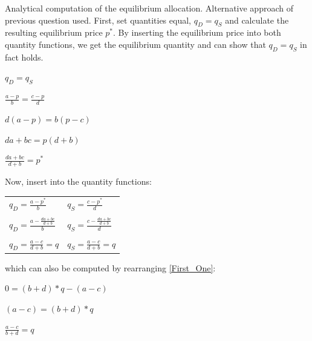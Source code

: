 \documentclass{article}
\begin{document}
Analytical computation of the equilibrium allocation. Alternative approach of previous question used. First, set quantities equal, $q_D = q_S$ and calculate the resulting equilibrium price $p^{*}$. By inserting the equilibrium price into both quantity functions, we get the equilibrium quantity and can show that $q_D = q_S$ in fact holds.
\begin{center} $q_D = q_S $ \end{center}
\begin{center}$\frac{a-p}{b} = \frac{c-p}{d} $ \end{center}
\begin{center}$d(a-p) = b(p-c)$ \end{center}
\begin{center}$da+bc=p(d+b)$ \end{center}
\begin{center}$\frac{da+bc}{d+b} = p^{*}$\end{center}
Now, insert into the quantity functions:
\begin{center} \begin{tabular}{ l l }
   $q_D= \frac{a-p^{*}}{b} $ & $q_S= \frac{c-p^{*}}{d} $  \\
   & \\
   $q_D= \frac{a-\frac{da+bc}{d+b}}{b} $ & $q_S= \frac{c-\frac{da+bc}{d+b}}{d} $  \\
   & \\
   $q_D= \frac{a-c}{d+b}=q $ & $q_S= \frac{a-c}{d+b}=q $  \\ \end{tabular} \end{center}
which can also be computed by rearranging \eqref{First_One}:
\begin{center}$0 =(b+d)*q-(a-c)$ \end{center}
\begin{center}$(a-c) =(b+d)*q$ \end{center}
\begin{center}$\frac{a-c}{b+d}=q$ \end{center}
\end{document}
